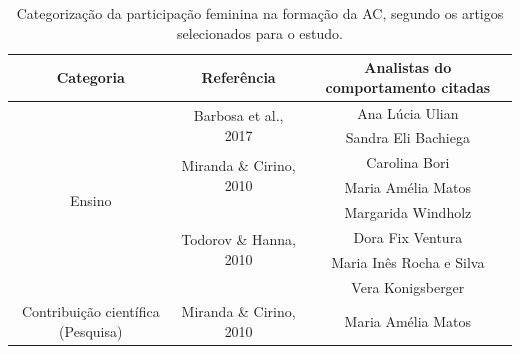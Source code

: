 \begin{table}[tbp]
\caption{Categorização da participação feminina na formação da AC, segundo os artigos selecionados para o estudo.}
\label{tabela012}
\begin{adjustbox}{max width=1\textwidth}
\begin{tabular}{@{}ccc@{}}
\toprule
\textbf{Categoria}                                                         & \textbf{Referência}                                           & \textbf{Analistas do comportamento citadas} \\ \midrule
\multicolumn{1}{c|}{\multirow{8}{*}{Ensino}}                               & \multicolumn{1}{c|}{\multirow{2}{*}{Barbosa et al., 2017}}    & Ana Lúcia Ulian                             \\
\multicolumn{1}{c|}{}                                                      & \multicolumn{1}{c|}{}                                         & Sandra Eli Bachiega                         \\ \cmidrule(l){2-3} 
\multicolumn{1}{c|}{}                                                      & \multicolumn{1}{c|}{\multirow{2}{*}{Miranda \& Cirino, 2010}} & Carolina Bori                               \\
\multicolumn{1}{c|}{}                                                      & \multicolumn{1}{c|}{}                                         & Maria Amélia Matos                          \\ \cmidrule(l){2-3} 
\multicolumn{1}{c|}{}                                                      & \multicolumn{1}{c|}{\multirow{4}{*}{Todorov \& Hanna, 2010}}  & Margarida Windholz                          \\
\multicolumn{1}{c|}{}                                                      & \multicolumn{1}{c|}{}                                         & Dora Fix Ventura                            \\
\multicolumn{1}{c|}{}                                                      & \multicolumn{1}{c|}{}                                         & Maria Inês Rocha e Silva                    \\
\multicolumn{1}{c|}{}                                                      & \multicolumn{1}{c|}{}                                         & Vera Konigsberger                           \\ \midrule
\multicolumn{1}{c|}{\multirow{10}{*}{Contribuição científica (Pesquisa)}}  & \multicolumn{1}{c|}{\multirow{6}{*}{Miranda \& Cirino, 2010}} & Maria Amélia Matos                          \\

\end{tabular}
\end{adjustbox}
\end{table}
